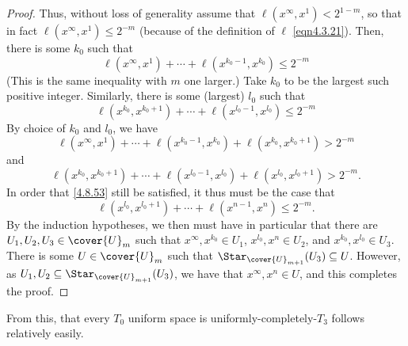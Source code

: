 \begin{thm}{}{}
\begin{proof}
Thus, without loss of generality assume that $\ell (x^\infty,x^1)<2^{1-m}$, so that in fact $\ell (x^{\infty},x^1)\leq 2^{-m}$ (because of the definition of $\ell$ \eqref{eqn4.3.21}).  Then, there is some $k_0$ such that
\begin{equation}
\ell (x^\infty,x^1)+\cdots +\ell (x^{k_0-1},x^{k_0})\leq 2^{-m}
\end{equation}
(This is the same inequality with $m$ one larger.)  Take $k_0$ to be the largest such positive integer.  Similarly, there is some (largest) $l_0$ such that
\begin{equation}
\ell (x^{k_0},x^{k_0+1})+\cdots +\ell (x^{l_0-1},x^{l_0})\leq 2^{-m}
\end{equation}
By choice of $k_0$ and $l_0$, we have
\begin{equation}
\ell (x^{\infty},x^1)+\cdots +\ell (x^{k_0-1},x^{k_0})+\ell (x^{k_0},x^{k_0+1})>2^{-m}
\end{equation}
and
\begin{equation}
\ell (x^{k_0},x^{k_0+1})+\cdots +\ell (x^{l_0-1},x^{l_0})+\ell (x^{l_0},x^{l_0+1})>2^{-m}.
\end{equation}
In order that \eqref{4.8.53} still be satisfied, it thus must be the case that
\begin{equation}
\ell (x^{l_0},x^{l_0+1})+\cdots +\ell (x^{n-1},x^n)\leq 2^{-m}.
\end{equation}
By the induction hypotheses, we then must have in particular that there are $U_1,U_2,U_3\in \cover{U}_{m}$ such that $x^\infty,x^{k_0}\in U_1$, $x^{l_0},x^n\in U_2$, and $x^{k_0},x^{l_0}\in U_3$.  There is some $U\in \cover{U}_m$ such that $\Star _{\cover{U}_{m+1}}(U_3)\subseteq U$.  However, as $U_1,U_2\subseteq \Star _{\cover{U}_{m+1}}(U_3)$, we have that $x^{\infty},x^n\in U$, and this completes the proof.
\end{proof}
\end{thm}
From this, that every $T_0$ uniform space is uniformly-completely-$T_3$ follows relatively easily.

